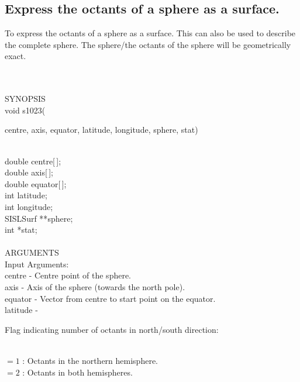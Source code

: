 \subsection{Express the octants of a sphere as a surface.}
\begin{minipg1}
  To express the octants of a sphere as a surface. This can also
  be used to describe the complete sphere.
  The sphere/the octants of the sphere will be geometrically exact.
\end{minipg1} \\ \\
SYNOPSIS\\
        \>void s1023(\begin{minipg3}
          {\fov centre},  {\fov axis},  {\fov equator},  {\fov latitude},  {\fov longitude},  {\fov sphere},  {\fov stat})
        \end{minipg3}\\[0.3ex]
        \>\>    double \> {\fov centre}[\,];\\
        \>\>    double \> {\fov axis}[\,];\\
        \>\>    double \> {\fov equator}[\,];\\
        \>\>    int    \> {\fov latitude};\\
        \>\>    int    \> {\fov longitude};\\
        \>\>    SISLSurf \> **{\fov sphere};\\
        \>\>    int    \> *{\fov stat};\\
\\
ARGUMENTS\\
        \>Input Arguments:\\
        \>\>    {\fov centre}\> - \> Centre point of the sphere.\\
        \>\>    {\fov axis}\> - \> Axis of the sphere (towards the north pole).\\
        \>\>    {\fov equator}\> - \> Vector from centre to start point
                                      on the equator.\\
        \>\>    {\fov latitude} \> - \>
        \begin{minipg2}
          Flag indicating number of
          octants in north/south direction:
        \end{minipg2}\\[0.3ex]
          \>\>\>\>\> $= 1$ : Octants in the northern hemisphere.\\
          \>\>\>\>\> $= 2$ : Octants in both hemispheres.\\
